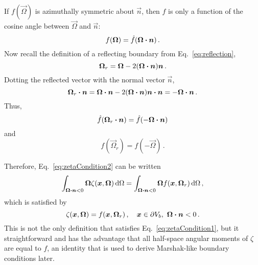 If $f(\vec{\Omega})$ is azimuthally symmetric about $\vec{n}$, then $f$ is only
a function of the cosine angle between $\vec{\Omega}$ and $\vec{n}$:
\begin{equation*}
f(\bm{\Omega}) = \hat f( \bm{\Omega} \bm{\cdot} \bm{n})\,.
\end{equation*}
Now recall the definition of a reflecting boundary from
Eq.~\eqref{eq:reflection},
\begin{equation*}
  \bm{\Omega}_r = \bm{\Omega} - 2(\bm{\Omega} \bm{\cdot} \bm{n}) \bm{n}\,.
\end{equation*}
Dotting the reflected vector with the normal vector $\vec{n}$,
\begin{equation*}
  \bm{\Omega}_r \bm{\cdot} \bm{n}
  = \bm{\Omega} \bm{\cdot} \bm{n} - 2(\bm{\Omega} \bm{\cdot} \bm{n}) \bm{n}\bm{\cdot} \bm{n}
  = - \bm{\Omega} \bm{\cdot} \bm{n}\,.
\end{equation*}
Thus,
\begin{equation*}
  \hat f( \bm{\Omega}_r \bm{\cdot} \bm{n}) = \hat f( -\bm{\Omega} \bm{\cdot} \bm{n})
\end{equation*}
and
\begin{equation}\label{eq:aziSymResult}
  f( \vec{\Omega}_r) = f( -\vec{\Omega} )\,.
\end{equation}

Therefore, Eq.~\eqref{eq:zetaCondition2} can be written
\begin{equation}\label{eq:zetaCondition3}
  \int_{\bm{\Omega} \bm{\cdot} \bm{n} < 0}
  \bm{\Omega} \zeta(\bm{x}, \bm{\Omega})\mathop{}\!\mathrm{d}\Omega
  = \int_{\bm{\Omega} \bm{\cdot} \bm{n} < 0}
  \bm{\Omega} f(\bm{x}, \bm{\Omega}_r)\mathop{}\!\mathrm{d}\Omega \,,
\end{equation}
which is satisfied by
\begin{equation} \label{eq:zetaReflecting}
  \zeta(\bm{x}, \bm{\Omega}) = f(\bm{x}, \bm{\Omega}_r) \,,
 \quad \bm{x} \in \partial V_b, \ \bm{\Omega} \bm{\cdot} \bm{n} < 0 \,.
\end{equation}
This is not the only definition that satisfies Eq.~\eqref{eq:zetaCondition1},
but it straightforward and has the advantage that all half-space angular moments
of $\zeta$ are equal to $f$, an identity that is used to derive Marshak-like
boundary conditions later.

